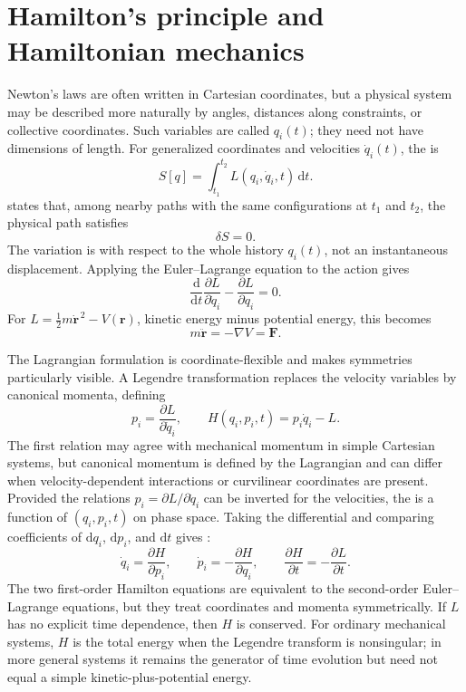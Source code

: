 \section{Hamilton's principle and Hamiltonian mechanics}

Newton's laws are often written in Cartesian coordinates, but a physical system may be described more naturally by angles, distances along constraints, or collective coordinates. Such variables are called  $q_i(t)$; they need not have dimensions of length. For generalized coordinates and velocities $\dot q_i(t)$, the  is
\begin{equation}
S[q]=\int_{t_1}^{t_2}L(q_i,\dot q_i,t)\,\mathrm{d}t.
\end{equation}
 states that, among nearby paths with the same configurations at $t_1$ and $t_2$, the physical path satisfies
\begin{equation}
\delta S=0.
\end{equation}
The variation is with respect to the whole history $q_i(t)$, not an instantaneous displacement. Applying the Euler--Lagrange equation to the action gives
\begin{equation}
\frac{\mathrm{d}}{\mathrm{d}t}\frac{\partial L}{\partial\dot q_i}
-\frac{\partial L}{\partial q_i}=0.
\end{equation}
For $L=\frac12m\dot{\mathbf{r}}^{\,2}-V(\mathbf{r})$, kinetic energy minus potential energy, this becomes
\begin{equation}
m\ddot{\mathbf{r}}=-\nabla V=\mathbf{F}.
\end{equation}

The Lagrangian formulation is coordinate-flexible and makes symmetries particularly visible. A Legendre transformation replaces the velocity variables by canonical momenta, defining
\begin{equation}
p_i=\frac{\partial L}{\partial\dot q_i},
\qquad
H(q_i,p_i,t)=p_i\dot q_i-L.
\end{equation}
The first relation may agree with mechanical momentum in simple Cartesian systems, but canonical momentum is defined by the Lagrangian and can differ when velocity-dependent interactions or curvilinear coordinates are present. Provided the relations $p_i=\partial L/\partial\dot q_i$ can be inverted for the velocities, the  is a function of $(q_i,p_i,t)$ on phase space. Taking the differential and comparing coefficients of $\mathrm{d}q_i$, $\mathrm{d}p_i$, and $\mathrm{d}t$ gives :
\begin{equation}
\dot q_i=\frac{\partial H}{\partial p_i},
\qquad
\dot p_i=-\frac{\partial H}{\partial q_i},
\qquad
\frac{\partial H}{\partial t}=-\frac{\partial L}{\partial t}.
\end{equation}
The two first-order Hamilton equations are equivalent to the second-order Euler--Lagrange equations, but they treat coordinates and momenta symmetrically. If $L$ has no explicit time dependence, then $H$ is conserved. For ordinary mechanical systems, $H$ is the total energy when the Legendre transform is nonsingular; in more general systems it remains the generator of time evolution but need not equal a simple kinetic-plus-potential energy.